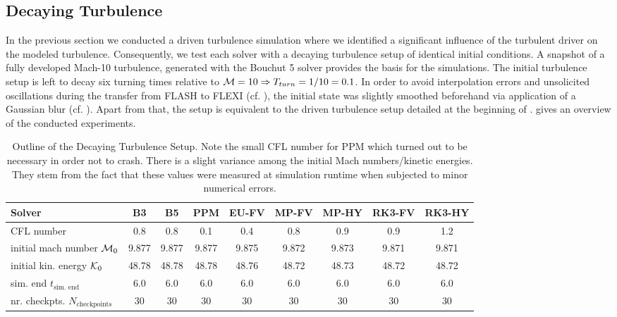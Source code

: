 \subsection{Decaying Turbulence}
\label{sec:decayturb}

In the previous section we conducted a driven turbulence simulation where we
identified a significant influence of the turbulent driver on the modeled
turbulence. Consequently, we test each solver with a decaying turbulence setup
of identical initial conditions. A snapshot of a fully developed Mach-10
turbulence, generated with the Bouchut 5 solver provides the basis for the
simulations. The initial turbulence setup is left to decay six turning times
relative to $\mathcal{M} = 10 \Rightarrow T_{turn} = 1/10 = 0.1$. In order to avoid
interpolation errors and unsolicited oscillations during the transfer from
FLASH to FLEXI (cf. ), the initial state was slightly smoothed beforehand via
application of a Gaussian blur (cf.
). Apart from that, the setup
is equivalent to the driven turbulence setup detailed at the beginning of
.  gives an overview of the conducted
experiments.
\begin{table}[H]
\fontsize{3mm}{3mm}\selectfont
\caption{Outline of the Decaying Turbulence Setup. Note the small CFL number
for PPM which turned out to be necessary in order not to crash. There is a
slight variance among the initial Mach numbers/kinetic energies. They stem from
the fact that these values were measured at simulation runtime when
subjected to minor numerical errors.}
\centering
\begin{tabular}{l| cccc cccc}
\toprule
Solver                          & B3 & B5 & PPM & EU-FV & MP-FV & MP-HY & RK3-FV & RK3-HY \\
\midrule
CFL number                            & 0.8 & 0.8 & 0.1 & 0.4 & 0.8 & 0.9 & 0.9 & 1.2 \\ 
initial mach number $\mathcal{M}_0$   & 9.877 & 9.877 & 9.877 & 9.875 & 9.872 & 9.873 & 9.871 & 9.871 \\
initial kin. energy $\mathcal{K}_0$   & 48.78 & 48.78 & 48.78 & 48.76 & 48.72 & 48.73 & 48.72 & 48.72 \\
sim. end $t_{\text{sim. end}}$           & 6.0 & 6.0 & 6.0 & 6.0 & 6.0 & 6.0 & 6.0 & 6.0 \\
nr. checkpts. $N_{\text{checkpoints}}$        & 30 & 30 & 30 & 30 & 30 & 30 & 30 & 30 \\
\bottomrule
\end{tabular}
\label{tab:setup-decayturb}
\end{table}

